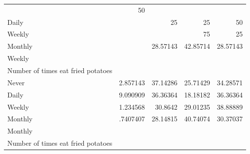 \documentclass{article}
\begin{document}
\begin{table}[!h]
{\begin{tabular}{lllll}
			\multicolumn{1}{r}{} &
			\multicolumn{1}{r}{50} \\
			\multicolumn{1}{l}{\hspace{5em}Daily} &
			\multicolumn{1}{|r}{} &
			\multicolumn{1}{r}{25} &
			\multicolumn{1}{r}{25} &
			\multicolumn{1}{r}{50} \\
			\multicolumn{1}{l}{\hspace{5em}Weekly} &
			\multicolumn{1}{|r}{} &
			\multicolumn{1}{r}{} &
			\multicolumn{1}{r}{75} &
			\multicolumn{1}{r}{25} \\
			\multicolumn{1}{l}{\hspace{5em}Monthly} &
			\multicolumn{1}{|r}{} &
			\multicolumn{1}{r}{28.57143} &
			\multicolumn{1}{r}{42.85714} &
			\multicolumn{1}{r}{28.57143} \\
			\multicolumn{1}{l}{\hspace{3em}Weekly} &
			\multicolumn{1}{|r}{} &
			\multicolumn{1}{r}{} &
			\multicolumn{1}{r}{} &
			\multicolumn{1}{r}{} \\
			\multicolumn{1}{l}{\hspace{4em}Number of times eat fried potatoes} &
			\multicolumn{1}{|r}{} &
			\multicolumn{1}{r}{} &
			\multicolumn{1}{r}{} &
			\multicolumn{1}{r}{} \\
			\multicolumn{1}{l}{\hspace{5em}Never} &
			\multicolumn{1}{|r}{2.857143} &
			\multicolumn{1}{r}{37.14286} &
			\multicolumn{1}{r}{25.71429} &
			\multicolumn{1}{r}{34.28571} \\
			\multicolumn{1}{l}{\hspace{5em}Daily} &
			\multicolumn{1}{|r}{9.090909} &
			\multicolumn{1}{r}{36.36364} &
			\multicolumn{1}{r}{18.18182} &
			\multicolumn{1}{r}{36.36364} \\
			\multicolumn{1}{l}{\hspace{5em}Weekly} &
			\multicolumn{1}{|r}{1.234568} &
			\multicolumn{1}{r}{30.8642} &
			\multicolumn{1}{r}{29.01235} &
			\multicolumn{1}{r}{38.88889} \\
			\multicolumn{1}{l}{\hspace{5em}Monthly} &
			\multicolumn{1}{|r}{.7407407} &
			\multicolumn{1}{r}{28.14815} &
			\multicolumn{1}{r}{40.74074} &
			\multicolumn{1}{r}{30.37037} \\
			\multicolumn{1}{l}{\hspace{3em}Monthly} &
			\multicolumn{1}{|r}{} &
			\multicolumn{1}{r}{} &
			\multicolumn{1}{r}{} &
			\multicolumn{1}{r}{} \\
			\multicolumn{1}{l}{\hspace{4em}Number of times eat fried potatoes} &

\end{tabular}}
\end{table}
\end{document}
